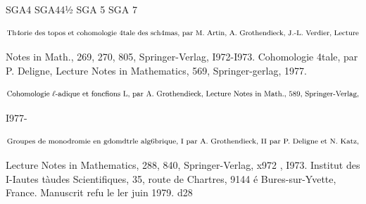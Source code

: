 \documentclass[11pt]{article}
\theoremstyle{remark}
\begin{document}
SGA4 SGA44½ SGA 5 SGA 7

\[\text{\small Th4orie des topos et cohomologie 4tale des sch4mas, par M. Artin, A. Grothendieck, J.-L. Verdier, Lecture}\]

Notes in Math., 269, 270, 805, Springer-Verlag, I972-I973. Cohomologie 4tale, par P. Deligne, Lecture Notes in Mathematics, 569, Springer-gerlag, 1977.

\[\text{\small Cohomologie \(\ell\)-adique et foncfions L, par A. Grothendieck, Lecture Notes in Math., 589, Springer-Verlag,}\]

I977-

\[\text{\small Groupes de monodromie en gdomdtrle alg6brique, I par A. Grothendieck, II par P. Deligne et N. Katz,}\]

Lecture Notes in Mathematics, 288, 840, Springer-Verlag, x972 , I973. Institut des I-Iautes tàudes Scientifiques, 35, route de Chartres, 9144 é Bures-sur-Yvette, France. Manuscrit refu le ler juin 1979. d28
\end{document}
